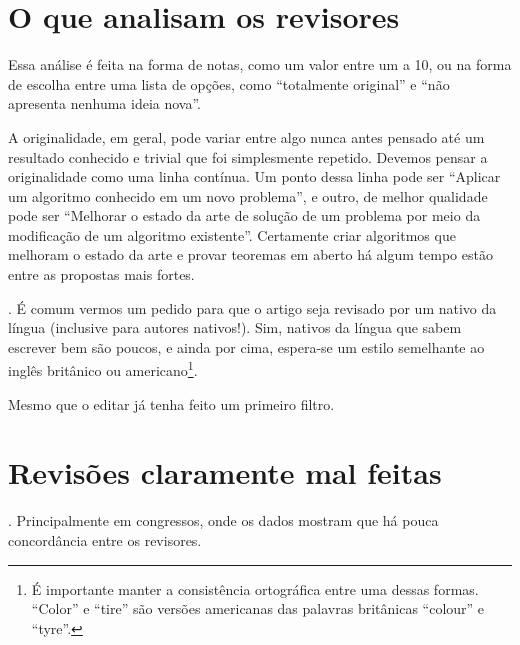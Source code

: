 \documentclass[openany]{book}
\begin{document}
\section{O que analisam os revisores}

 Essa análise é feita na forma de notas, como um valor entre um a 10, ou na forma de escolha entre uma lista de opções, como ``totalmente original'' e ``não apresenta nenhuma ideia nova''.


 A originalidade, em geral, pode variar entre algo nunca antes pensado até um resultado conhecido e trivial que foi simplesmente repetido. Devemos pensar a originalidade como uma linha contínua. Um ponto dessa linha pode ser ``Aplicar um algoritmo conhecido em um novo problema'', e outro, de melhor qualidade pode ser ``Melhorar o estado da arte de solução de um problema por meio da modificação de um algoritmo existente''. Certamente criar algoritmos que melhoram o estado da arte e provar teoremas em aberto há algum tempo estão entre as propostas mais fortes.

. É comum vermos um pedido para que o artigo seja revisado por um nativo da língua (inclusive para autores nativos!). Sim, nativos da língua que sabem escrever bem são poucos, e ainda por cima, espera-se um estilo semelhante ao inglês britânico ou americano\footnote{É importante manter a consistência ortográfica entre uma dessas formas. ``Color'' e ``tire'' são versões americanas das palavras britânicas ``colour'' e ``tyre''.}.


 Mesmo que o editar já tenha feito um primeiro filtro.

\section{Revisões claramente mal feitas}


. Principalmente em congressos, onde os dados mostram que há pouca concordância entre os revisores\favorcitar.
\end{document}
